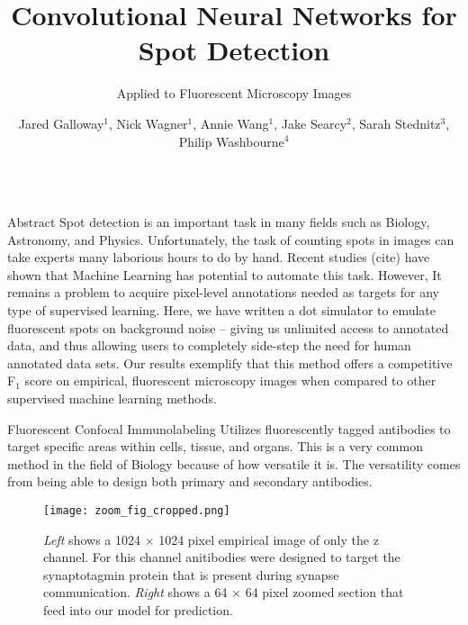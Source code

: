 \documentclass[final]{beamer}
\title{Convolutional Neural Networks for Spot Detection} %
\subtitle{Applied to Fluorescent Microscopy Images} %
\author{Jared Galloway$^1$, Nick Wagner$^1$, Annie Wang$^1$, Jake Searcy$^2$, Sarah Stednitz$^3$, Philip Washbourne$^4$} %
\institute{1. BGMP, University of Oregon 2. RACS, University of Oregon 3. Max Planck Institute for Biological Cybernetic}
\newlength{\sepwid}
\newlength{\onecolwid}
\begin{document}

\setlength{\belowcaptionskip}{2ex} %
\setlength\belowdisplayshortskip{2ex} %

\begin{frame}[t] %

\begin{columns}[t] %


\begin{column}{\onecolwid}
\begin{block}{Abstract}
\vspace{.2in}
Spot detection is an important task in many fields such as Biology, Astronomy, and Physics. Unfortunately, the task of counting spots in images can take experts many laborious hours to do by hand. Recent studies (cite) have shown that Machine Learning has potential to automate this task. However, It remains a problem to acquire pixel-level annotations needed as targets for any type of supervised learning.  Here, we have written a dot simulator to emulate fluorescent spots on background noise --  giving us unlimited access to annotated data, and thus allowing users to completely side-step the need for human annotated data sets. Our results exemplify that this method offers a competitive F$_1$ score on empirical, fluorescent microscopy images when compared to other supervised machine learning methods.

\vspace{.4in}

\begin{alertblock}{Fluorescent Confocal Immunolabeling}
Utilizes fluorescently tagged antibodies to target specific areas within cells, tissue, and organs. This is a very common method in the field of Biology because of how versatile it is. The versatility comes from being able to design both primary and secondary antibodies.
\end{alertblock}
    \begin{figure}
        \texttt{[image: zoom\_fig\_cropped.png]}
        \setlength{\belowcaptionskip}{-20pt}
        \caption{\textit{Left} shows a 1024 $\times$ 1024 pixel empirical image of only the z channel. For this channel anitibodies were designed to target the synaptotagmin protein that is present during synapse communication. \textit{Right} shows a 64 $\times$ 64 pixel zoomed section that feed into our model for prediction.}
    \end{figure}
\end{block}


\end{column}
\end{columns}
\end{frame}
\end{document}
